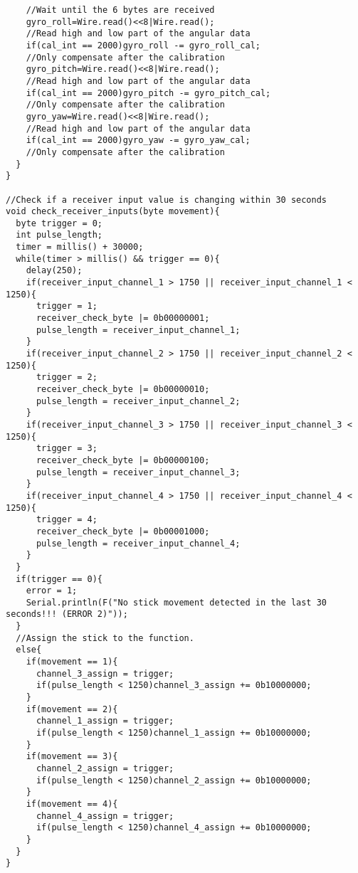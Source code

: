\begin{lstlisting}
    //Wait until the 6 bytes are received
    gyro_roll=Wire.read()<<8|Wire.read();                        
    //Read high and low part of the angular data
    if(cal_int == 2000)gyro_roll -= gyro_roll_cal;               
    //Only compensate after the calibration
    gyro_pitch=Wire.read()<<8|Wire.read();                       
    //Read high and low part of the angular data
    if(cal_int == 2000)gyro_pitch -= gyro_pitch_cal;             
    //Only compensate after the calibration
    gyro_yaw=Wire.read()<<8|Wire.read();                         
    //Read high and low part of the angular data
    if(cal_int == 2000)gyro_yaw -= gyro_yaw_cal;                 
    //Only compensate after the calibration
  }
}

//Check if a receiver input value is changing within 30 seconds
void check_receiver_inputs(byte movement){
  byte trigger = 0;
  int pulse_length;
  timer = millis() + 30000;
  while(timer > millis() && trigger == 0){
    delay(250);
    if(receiver_input_channel_1 > 1750 || receiver_input_channel_1 < 1250){
      trigger = 1;
      receiver_check_byte |= 0b00000001;
      pulse_length = receiver_input_channel_1;
    }
    if(receiver_input_channel_2 > 1750 || receiver_input_channel_2 < 1250){
      trigger = 2;
      receiver_check_byte |= 0b00000010;
      pulse_length = receiver_input_channel_2;
    }
    if(receiver_input_channel_3 > 1750 || receiver_input_channel_3 < 1250){
      trigger = 3;
      receiver_check_byte |= 0b00000100;
      pulse_length = receiver_input_channel_3;
    }
    if(receiver_input_channel_4 > 1750 || receiver_input_channel_4 < 1250){
      trigger = 4;
      receiver_check_byte |= 0b00001000;
      pulse_length = receiver_input_channel_4;
    } 
  }
  if(trigger == 0){
    error = 1;
    Serial.println(F("No stick movement detected in the last 30 seconds!!! (ERROR 2)"));
  }
  //Assign the stick to the function.
  else{
    if(movement == 1){
      channel_3_assign = trigger;
      if(pulse_length < 1250)channel_3_assign += 0b10000000;
    }
    if(movement == 2){
      channel_1_assign = trigger;
      if(pulse_length < 1250)channel_1_assign += 0b10000000;
    }
    if(movement == 3){
      channel_2_assign = trigger;
      if(pulse_length < 1250)channel_2_assign += 0b10000000;
    }
    if(movement == 4){
      channel_4_assign = trigger;
      if(pulse_length < 1250)channel_4_assign += 0b10000000;
    }
  }
}


\end{lstlisting}
